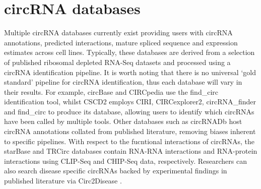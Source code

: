 \documentclass[journal,review,submit,pdftex,moreauthors]{Definitions/mdpi}
\begin{document}
\section{circRNA databases}
Multiple circRNA databases currently exist providing users with circRNA annotations, predicted interactions, mature spliced sequence and expression estimates across cell lines. Typically, these databases are derived from a selection of published ribosomal depleted RNA-Seq datasets \cite{find_circ,Salzman2012,Jeck2012Dec,Salzman2014Jun,Ivanov2015Jan,Rybak-Wolf2015Jun,Ashwal-Fluss2014Oct,Maass2017Nov} and processed using a circRNA identification pipeline. It is worth noting that there is no universal `gold standard' pipeline for circRNA identification, thus each database will vary in their results. For example, circBase \cite{circbase} and CIRCpedia \cite{circpedia} use the find\_circ identification tool, whilst CSCD2 \cite{CSCD2} employs CIRI, CIRCexplorer2, circRNA\_finder and find\_circ to produce its database, allowing users to identify which circRNAs have been called by multiple tools. Other databases such as circRNADb \cite{circrnadb} host circRNA annotations collated from published literature, removing biases inherent to specific pipelines. With respect to the fucntional interactions of circRNAs, the starBase \cite{starbase} and TRCirc \cite{TRCirc} databases contain RNA-RNA interactions and RNA-protein interactions using CLIP-Seq and CHIP-Seq data, respectively. Researchers can also search disease specific circRNAs backed by experimental findings in published literature via Circ2Disease \cite{circ2disease}. \par
\end{document}
